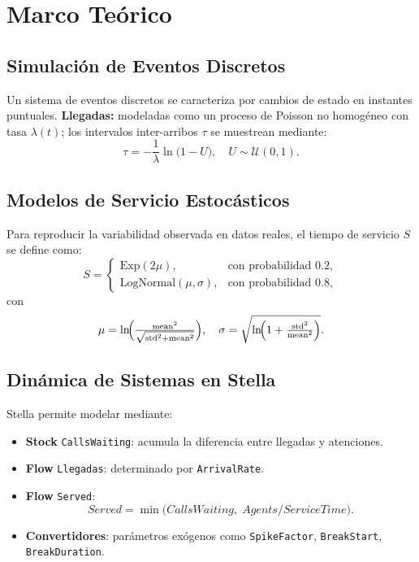 \documentclass[12pt]{article}
\begin{document}
\newpage
\section{Marco Teórico}

\subsection{Simulación de Eventos Discretos}
Un sistema de eventos discretos se caracteriza por cambios de estado en instantes puntuales.  
\textbf{Llegadas:} modeladas como un proceso de Poisson no homogéneo con tasa $\lambda(t)$; los intervalos inter-arribos $\tau$ se muestrean mediante:
\[
  \tau = -\frac{1}{\lambda}\ln\bigl(1 - U\bigr),\quad U\sim \mathcal{U}(0,1).
\]

\subsection{Modelos de Servicio Estocásticos}
Para reproducir la variabilidad observada en datos reales, el tiempo de servicio $S$ se define como:
\[
  S =
  \begin{cases}
    \mathrm{Exp}(2\mu), & \text{con probabilidad }0.2,\\[6pt]
    \mathrm{LogNormal}(\mu,\sigma), & \text{con probabilidad }0.8,
  \end{cases}
\]
con
\[
  \mu = \ln\!\Bigl(\tfrac{\text{mean}^2}{\sqrt{\text{std}^2 + \text{mean}^2}}\Bigr), \quad
  \sigma = \sqrt{\ln\!\Bigl(1+\tfrac{\text{std}^2}{\text{mean}^2}\Bigr)}.
\]

\subsection{Dinámica de Sistemas en Stella}
Stella permite modelar mediante:
\begin{itemize}
  \item \textbf{Stock} \texttt{CallsWaiting}: acumula la diferencia entre llegadas y atenciones.
  \item \textbf{Flow} \texttt{Llegadas}: determinado por \texttt{ArrivalRate}.
  \item \textbf{Flow} \texttt{Served}: 
    \[
      Served = \min\bigl(CallsWaiting,\;Agents/ServiceTime\bigr).
    \]
  \item \textbf{Convertidores}: parámetros exógenos como \texttt{SpikeFactor}, \texttt{BreakStart}, \texttt{BreakDuration}.
\end{itemize}
\end{document}
